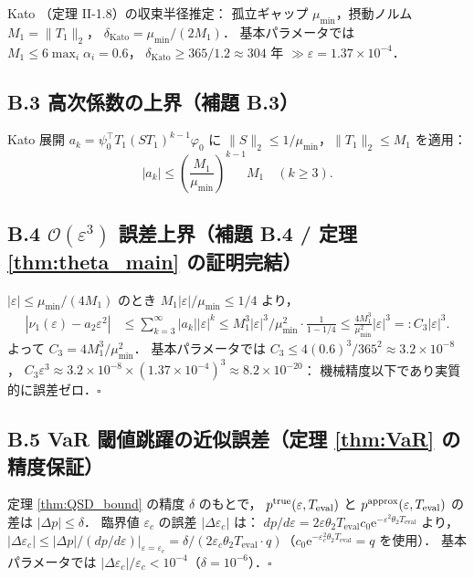 \documentclass[12pt,a4paper]{article}
\theoremstyle{plain}
\theoremstyle{definition}
\theoremstyle{remark}
\newcommand{\calO}{\mathcal{O}}
\newcommand{\eps}{\varepsilon}
\newcommand{\e}{\mathrm{e}}
\newcommand{\RedRes}{S}
\newcommand{\Teval}{T_{\mathrm{eval}}}
\begin{document}
Kato \cite{kato1995}（定理 II-1.8）の収束半径推定：
孤立ギャップ $\mu_{\min}$，摂動ノルム $M_1=\|T_1\|_2$，
$\delta_{\mathrm{Kato}} = \mu_{\min}/(2M_1)$．
基本パラメータでは $M_1\le6\max_i\alpha_i=0.6$，
$\delta_{\mathrm{Kato}}\ge365/1.2\approx304$ 年 $\gg\eps=1.37\times10^{-4}$．

\subsection*{B.3 高次係数の上界（補題 B.3）}

Kato 展開 $a_k=\psi_0^\top T_1(\RedRes T_1)^{k-1}\varphi_0$ に
$\|\RedRes\|_2\le1/\mu_{\min}$，$\|T_1\|_2\le M_1$ を適用：
\begin{equation}
  |a_k| \le \left(\frac{M_1}{\mu_{\min}}\right)^{k-1} M_1 \quad(k\ge3).
\end{equation}

\subsection*{B.4 $\calO(\eps^3)$ 誤差上界（補題 B.4 / 定理 \ref{thm:theta_main} の証明完結）}

$|\eps|\le\mu_{\min}/(4M_1)$ のとき $M_1|\eps|/\mu_{\min}\le1/4$ より，
\begin{align}
  \left|\nu_1(\eps)-a_2\eps^2\right|
  &\le \sum_{k=3}^\infty|a_k||\eps|^k
   \le M_1^3|\eps|^3/\mu_{\min}^2 \cdot \frac{1}{1-1/4}
   \le \frac{4M_1^3}{\mu_{\min}^2}|\eps|^3 =: C_3|\eps|^3.
\end{align}
よって $C_3=4M_1^3/\mu_{\min}^2$．
基本パラメータでは $C_3\le4(0.6)^3/365^2\approx3.2\times10^{-8}$，
$C_3\eps^3\approx3.2\times10^{-8}\times(1.37\times10^{-4})^3\approx8.2\times10^{-20}$：
機械精度以下であり実質的に誤差ゼロ．\hfill$\square$

\subsection*{B.5 VaR 閾値跳躍の近似誤差（定理 \ref{thm:VaR} の精度保証）}

定理 \ref{thm:QSD_bound} の精度 $\delta$ のもとで，
$p^{\rm true}(\eps,\Teval)$ と $p^{\rm approx}(\eps,\Teval)$ の差は $|\Delta p|\le\delta$．
臨界値 $\eps_c$ の誤差 $|\Delta\eps_c|$ は：
$dp/d\eps = 2\eps\theta_2\Teval c_0\e^{-\eps^2\theta_2\Teval}$ より，
$|\Delta\eps_c|\le|\Delta p|/(dp/d\eps)|_{\eps=\eps_c}
= \delta/(2\eps_c\theta_2\Teval\cdot q)$（$c_0\e^{-\eps_c^2\theta_2\Teval}=q$ を使用）．
基本パラメータでは $|\Delta\eps_c|/\eps_c<10^{-4}$（$\delta=10^{-6}$）．\hfill$\square$
\end{document}
